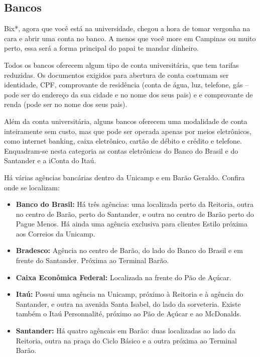 \subsection{Bancos}

Bix*, agora que você está na universidade, chegou a hora de tomar vergonha na
cara e abrir uma conta no banco. A menos que você more em Campinas ou muito
perto, essa será a forma principal do papai te mandar dinheiro.

Todos os bancos oferecem algum tipo de conta universitária, que tem tarifas
reduzidas. Os documentos exigidos para abertura de conta costumam ser
identidade, CPF, comprovante de residência (conta de água, luz, telefone, gás --
pode ser do endereço da sua cidade e no nome dos seus pais) e e comprovante de
renda (pode ser no nome dos seus pais).

Além da conta universitária, alguns bancos oferecem uma modalidade de conta
inteiramente sem custo, mas que pode ser operada apenas por meios eletrônicos,
como internet banking, caixa eletrônico, cartão de débito e crédito e telefone.
Enquadram-se nesta categoria as contas eletrônicas do Banco do Brasil e do
Santander e a iConta do Itaú.

Há várias agências bancárias dentro da Unicamp e em Barão Geraldo. Confira onde
se localizam:

\begin{itemize}
    \item  \textbf{Banco do Brasil:} Há três agências: uma localizada perto da
        Reitoria, outra no centro de Barão, perto do Santander, e outra no
        centro de Barão perto do Pague Menos. Há ainda uma agência exclusiva
        para clientes Estilo próxima aos Correios da Unicamp.

    \item  \textbf{Bradesco:} Agência no centro de Barão, do lado do Banco do
        Brasil e em frente do Santander. Próxima ao Terminal Barão.

    \item  \textbf{Caixa Econômica Federal:} Localizada na frente do Pão de
        Açúcar.

    \item  \textbf{Itaú:} Possui uma agência na Unicamp, próximo à Reitoria e à
        agência do Santander, e outra na avenida Santa Isabel, do lado da
        sorveteria. Existe também o Itaú Personnalité, próximo ao Pão de Açúcar e
        ao McDonalds.

    \item  \textbf{Santander:} Há quatro agêncais em Barão: duas localizadas ao
        lado da Reitoria, outra na praça do Ciclo Básico e a outra próxima ao
        Terminal Barão.
\end{itemize}

